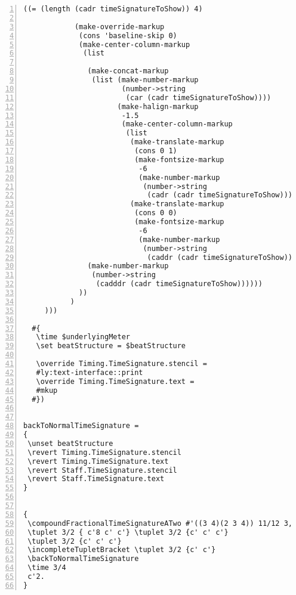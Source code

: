 \begin{Verbatim}[numbers=left,xleftmargin=5mm]
           ((= (length (cadr timeSignatureToShow)) 4)

            (make-override-markup
             (cons 'baseline-skip 0)
             (make-center-column-markup
              (list

               (make-concat-markup
                (list (make-number-markup
                       (number->string
                        (car (cadr timeSignatureToShow))))
                      (make-halign-markup
                       -1.5
                       (make-center-column-markup
                        (list
                         (make-translate-markup
                          (cons 0 1)
                          (make-fontsize-markup
                           -6
                           (make-number-markup
                            (number->string
                             (cadr (cadr timeSignatureToShow))))))
                         (make-translate-markup
                          (cons 0 0)
                          (make-fontsize-markup
                           -6
                           (make-number-markup
                            (number->string
                             (caddr (cadr timeSignatureToShow)))))))))))
               (make-number-markup
                (number->string
                 (cadddr (cadr timeSignatureToShow))))))
             ))
           )
     )))

  #{
   \time $underlyingMeter
   \set beatStructure = $beatStructure

   \override Timing.TimeSignature.stencil =
   #ly:text-interface::print
   \override Timing.TimeSignature.text =
   #mkup
  #})


backToNormalTimeSignature =
{
 \unset beatStructure
 \revert Timing.TimeSignature.stencil
 \revert Timing.TimeSignature.text
 \revert Staff.TimeSignature.stencil
 \revert Staff.TimeSignature.text
}


{
 \compoundFractionalTimeSignatureATwo #'((3 4)(2 3 4)) 11/12 3,3,3,2
 \tuplet 3/2 { c'8 c' c'} \tuplet 3/2 {c' c' c'}
 \tuplet 3/2 {c' c' c'}
 \incompleteTupletBracket \tuplet 3/2 {c' c'}
 \backToNormalTimeSignature
 \time 3/4
 c'2.
}
\end{Verbatim}
\label{sec:compoundfractionalmeter_discussion}
